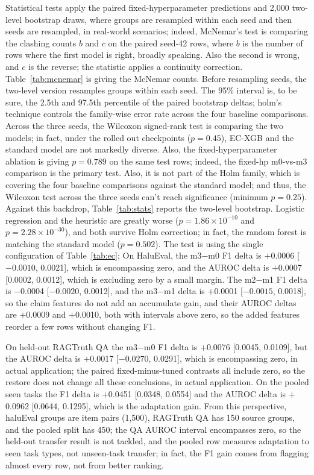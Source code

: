 \documentclass[a4paper,fleqn]{cas-sc}
\begin{document}
Statistical tests apply the paired fixed-hyperparameter predictions and 2{,}000 two-level bootstrap draws, where groups are resampled within each seed and then seeds are resampled, in real-world scenarios; indeed, McNemar's test is comparing the clashing counts $b$ and $c$ on the paired seed-42 rows, where $b$ is the number of rows where the first model is right, broadly speaking. Also the second is wrong, and $c$ is the reverse; the statistic applies a continuity correction. Table~\ref{tab:mcnemar} is giving the McNemar counts. Before resampling seeds, the two-level version resamples groups within each seed. The 95\% interval is, to be sure, the 2.5th and 97.5th percentile of the paired bootstrap deltas; holm's technique controls the family-wise error rate across the four baseline comparisons. Across the three seeds, the Wilcoxon signed-rank test is comparing the two models; in fact, under the rolled out checkpoints ($p=0.45$), EC-XGB and the standard model are not markedly diverse. Also, the fixed-hyperparameter ablation is giving $p=0.789$ on the same test rows; indeed, the fixed-hp m0-vs-m3 comparison is the primary test. Also, it is not part of the Holm family, which is covering the four baseline comparisons against the standard model; and thus, the Wilcoxon test across the three seeds can't reach significance (minimum $p=0.25$). Against this backdrop, Table~\ref{tab:stats} reports the two-level bootstrap. Logistic regression and the heuristic are greatly worse ($p=1.86\times10^{-10}$ and $p=2.28\times10^{-30}$), and both survive Holm correction; in fact, the random forest is matching the standard model ($p=0.502$). The test is using the single configuration of Table~\ref{tab:ec}; On HaluEval, the m3$-$m0 F1 delta is $+$0.0006 [$-0.0010$, 0.0021], which is encompassing zero, and the AUROC delta is $+$0.0007 [0.0002, 0.0012], which is excluding zero by a small margin. The m2$-$m1 F1 delta is $-$0.0004 [$-0.0020$, 0.0012], and the m3$-$m1 delta is $+$0.0001 [$-0.0015$, 0.0018], so the claim features do not add an accumulate gain, and their AUROC deltas are $+$0.0009 and $+$0.0010, both with intervals above zero, so the added features reorder a few rows without changing F1.

On held-out RAGTruth QA the m3$-$m0 F1 delta is $+$0.0076 [0.0045, 0.0109], but the AUROC delta is $+$0.0017 [$-0.0270$, 0.0291], which is encompassing zero, in actual application; the paired fixed-minus-tuned contrasts all include zero, so the restore does not change all these conclusions, in actual application. On the pooled seen tasks the F1 delta is $+$0.0451 [0.0348, 0.0554] and the AUROC delta is $+$0.0962 [0.0644, 0.1295], which is the adaptation gain. From this perspective, haluEval groups are item pairs (1{,}500), RAGTruth QA has 150 source groups, and the pooled split has 450; the QA AUROC interval encompasses zero, so the held-out transfer result is not tackled, and the pooled row measures adaptation to seen task types, not unseen-task transfer; in fact, the F1 gain comes from flagging almost every row, not from better ranking.
\end{document}
